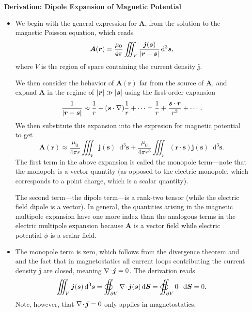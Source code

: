 \documentclass[11pt, a4paper]{article}
\newcommand{\diff}{\mathop{}\!\mathrm{d}} %
\renewcommand{\vec}[1]{\bm{#1}} %
\renewcommand{\r}{\vec{r}}
\newcommand{\A}{\vec{A}} %
\newcommand{\mm}{\mu_{0}}  %
\renewcommand{\j}{\vec{j}}  %
\newcommand{\s}{\vec{s}}  %
\newcommand{\ds}{\diff^{3} \s}  %
\renewcommand{\div}{\nabla \mspace{-2mu} \cdot \mspace{-2mu}}
\renewcommand{\grad}{\nabla}
\begin{document}
\textbf{Derivation: Dipole Expansion of Magnetic Potential}
\begin{itemize}
	\item We begin with the general expression for $ \A $, from the solution to the magnetic Poisson equation, which reads
	\begin{equation*}
		\A(\r) = \frac{\mm}{4\pi}\iiint_{V}\frac{\j(\s)}{\abs{\r - \s}}\ds,
	\end{equation*}
    where $ V $ is the region of space containing the current density $ \j $. 

    We then consider the behavior of $ \A(\r) $ far from the source of $ \A $, and expand $ \A $ in the regime of $ \abs{\r} \gg \abs{\s} $ using the first-order expansion
	\begin{equation*}
		\frac{1}{\abs{\r - \s}} \approx \frac{1}{r} - (\s \cdot \grad) \frac{1}{r} + \cdots = \frac{1}{r} + \frac{\s \cdot \r}{r^{3}} + \cdots.
	\end{equation*}
    We then substitute this expansion into the expresion for magnetic potential to get
	\begin{equation*}
		\A(\r) \approx \frac{\mm}{4\pi r}\iiint_{V} \j(\s) \ds + \frac{\mm}{4\pi r^{3}} \iiint_{V}(\r \cdot \s)\j(\s)\ds.
	\end{equation*}
	The first term in the above expansion is called the monopole term---note that the monopole is a vector quantity (as opposed to the electric monopole, which corresponds to a point charge, which is a scalar quantity).
	
	The second term---the dipole term---is a rank-two tensor (while the electric field dipole is a vector). In general, the quantities arising in the magnetic multipole expansion have one more index than the analogous terms in the electric multipole expansion because $ \A $ is a vector field while electric potential $ \phi $ is a scalar field.

    \item The monopole term is zero, which follows from the divergence theorem and and the fact that in magnetostatics all current loops contributing the current density $ \j $ are closed, meaning $ \div \j = 0 $. The derivation reads
	\begin{equation*}
        \iiint_{V} \j(\s) \ds = \oiint_{\partial V} \div \j(\s) \diff \vec{S} = \oiint_{\partial V} 0 \cdot \diff \vec{S} = 0.
	\end{equation*}
    Note, however, that $ \div \j = 0 $ only applies in magnetostatics.


\end{itemize}
\end{document}
